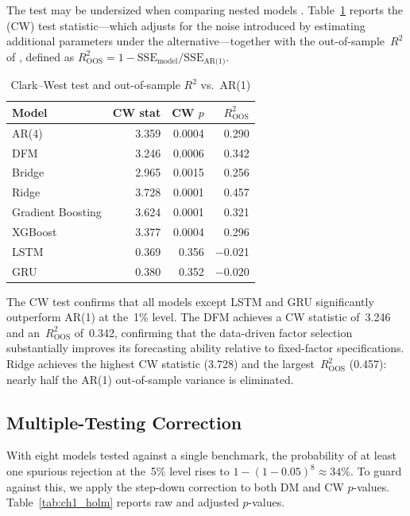 The \citet{diebold1995comparing} test may be undersized when comparing nested models \citep{clark2007approximately}.  Table~\ref{tab:ch1_clarkwest} reports the \citet{clark2007approximately} (CW) test statistic---which adjusts for the noise introduced by estimating additional parameters under the alternative---together with the out-of-sample~$R^2$ of \citet{campbell2008predicting}, defined as $R^2_{\text{OOS}} = 1 - \text{SSE}_{\text{model}} / \text{SSE}_{\text{AR(1)}}$.

\begin{table}[htbp]
\centering
\caption{Clark--West test and out-of-sample $R^2$ vs.\ AR(1)}
\label{tab:ch1_clarkwest}
\begin{tabular}{@{} l r r r @{}}
\toprule
{Model} & {CW stat} & {CW $p$} & {$R^2_{\text{OOS}}$} \\
\midrule
AR(4)              & 3.359 & 0.0004 & 0.290 \\
DFM                & 3.246 & 0.0006 & 0.342 \\
Bridge             & 2.965 & 0.0015 & 0.256 \\
Ridge              & 3.728 & 0.0001 & 0.457 \\
Gradient Boosting  & 3.624 & 0.0001 & 0.321 \\
XGBoost            & 3.377 & 0.0004 & 0.296 \\
LSTM               & 0.369 & 0.356  & $-$0.021 \\
GRU                & 0.380 & 0.352  & $-$0.020 \\
\bottomrule
\end{tabular}
\end{table}

The CW test confirms that all models except LSTM and GRU significantly outperform AR(1) at the~1\% level.  The DFM achieves a CW statistic of~3.246 and an~$R^2_{\text{OOS}}$ of~0.342, confirming that the data-driven factor selection substantially improves its forecasting ability relative to fixed-factor specifications.  Ridge achieves the highest CW statistic (3.728) and the largest~$R^2_{\text{OOS}}$ (0.457): nearly half the AR(1) out-of-sample variance is eliminated.

\subsection{Multiple-Testing Correction}

With eight models tested against a single benchmark, the probability of at least one spurious rejection at the~5\% level rises to $1 - (1-0.05)^8 \approx 34\%$.  To guard against this, we apply the \citet{holm1979simple} step-down correction to both DM and CW $p$-values.  Table~\ref{tab:ch1_holm} reports raw and adjusted $p$-values.

